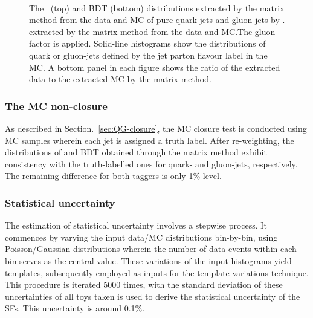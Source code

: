 \begin{figure}[htb]
  	 \\
  	\caption[]{
  		The \ntrk~(top) and BDT (bottom) distributions extracted by the matrix method from the data and MC of pure quark-jets   and  gluon-jets    by . %
  		extracted by the matrix method from the data and MC.The gluon factor is applied. Solid-line histograms show the distributions of quark or gluon-jets defined by the jet parton flavour label in the MC.
  		A bottom panel in each figure shows the ratio of the extracted data to the extracted MC by the matrix method. %
  		\label{fig:QG-pythia-NtrkData800Gluon}
  	}
  \end{figure}
  
  \FloatBarrier
  
    \subsubsection{The MC non-closure}
   As described in Section.~\ref{sec:QG-closure}, the MC closure test is conducted using MC samples wherein each jet is assigned a truth label. After re-weighting, the distributions of {\ntrk} and BDT obtained through the matrix method exhibit consistency with the truth-labelled ones for quark- and gluon-jets, respectively. The remaining difference for both taggers is only 1\% level.



    \subsubsection{Statistical uncertainty}
 The estimation of statistical uncertainty involves a stepwise process. It commences by varying the input data/MC distributions bin-by-bin, using Poisson/Gaussian distributions wherein the number of data events within each bin serves as the central value. These variations of the input histograms yield templates, subsequently employed as inputs for the template variations technique. This procedure is iterated 5000 times, with the standard deviation of these uncertainties of all toys taken is used to derive the statistical uncertainty of the SFs. This uncertainty is around 0.1\%.
    

